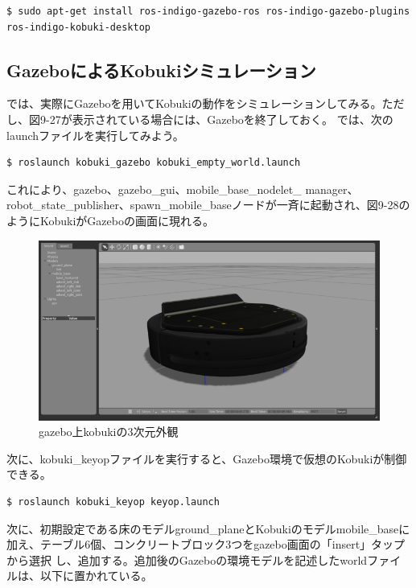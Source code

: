 \begin{itemize}
\begin{lstlisting}[language=ROS]
$ sudo apt-get install ros-indigo-gazebo-ros ros-indigo-gazebo-plugins ros-indigo-kobuki-desktop
\end{lstlisting}

\subsection{GazeboによるKobukiシミュレーション}

では、実際にGazeboを用いてKobukiの動作をシミュレーションしてみる。ただし、図9-27が表示されている場合には、Gazeboを終了しておく。 では、次のlaunchファイルを実行してみよう。

\begin{lstlisting}[language=ROS]
$ roslaunch kobuki_gazebo kobuki_empty_world.launch
\end{lstlisting}

これにより、gazebo、gazebo\_gui、mobile\_base\_nodelet\_ manager、robot\_state\_publisher、spawn\_mobile\_baseノードが一斉に起動され、図9-28のようにKobukiがGazeboの画面に現れる。

\begin{figure}[ht]
  \centering
  \includegraphics[width=\columnwidth]{pictures/chapter9/pic_09_28.png}
  \caption{gazebo上kobukiの3次元外観}
\end{figure}

次に、kobuki\_keyopファイルを実行すると、Gazebo環境で仮想のKobukiが制御できる。

\begin{lstlisting}[language=ROS]
$ roslaunch kobuki_keyop keyop.launch
\end{lstlisting}

次に、初期設定である床のモデルground\_planeとKobukiのモデルmobile\_baseに加え、テーブル6個、コンクリートブロック3つをgazebo画面の「insert」タップから選択   し、追加する。追加後のGazeboの環境モデルを記述したworldファイルは、以下に置かれている。


\end{itemize}
